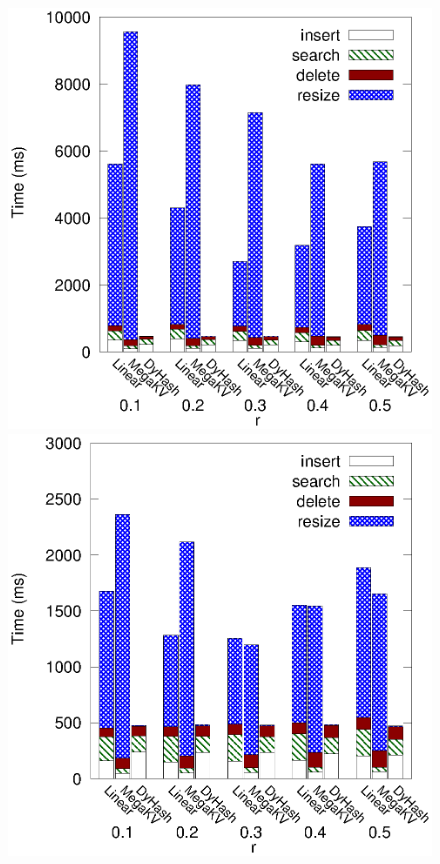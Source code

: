 \begin{figure}[h]
	\begin{minipage}{0.18\linewidth}\centering
		\includegraphics[width=\linewidth]{pic/dynamic/twitter/diff_r.eps}
		\centerline{\dstwitter}
	\end{minipage}
	\hfill
	\begin{minipage}{0.18\linewidth}\centering
		\includegraphics[width=\linewidth]{pic/dynamic/reddit/diff_r.eps}

\end{minipage}
\end{figure}
